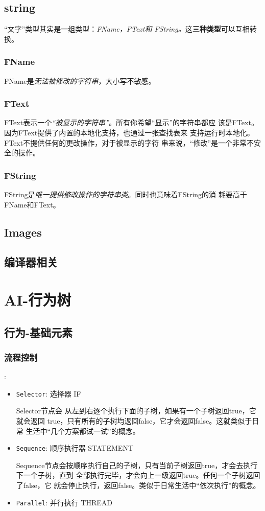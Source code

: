 \documentclass[UTF8,a4paper,12pt]{ctexbook}
\begin{document}
	\section{string}
		“文字”类型其实是一组类型：\textit{FName，FText和 FString。}这\textbf{三种类型}可以互相转换。
		
		\subsection{FName}
			FName是\textit{无法被修改的字符串}，大小写不敏感。
			
		\subsection{FText}
			FText表示一个\textit{“被显示的字符串”}。所有你希望“显示”的字符串都应 该是FText。因为FText提供了内置的本地化支持，也通过一张查找表来 支持运行时本地化。FText不提供任何的更改操作，对于被显示的字符 串来说，“修改”是一个非常不安全的操作。
			
		\subsection{FString}
			FString是\textit{唯一提供修改操作的字符串类}。同时也意味着FString的消 耗要高于FName和FText。
		
	\section{Images}
	
	
	\section{编译器相关}
	

\chapter{AI-行为树}
	\section{行为-基础元素}
	
		\subsection{流程控制}:
			\begin{itemize}
				\item \verb|Selector|: 选择器 IF
				
					Selector节点会 从左到右逐个执行下面的子树，如果有一个子树返回true，它就会返回 true，只有所有的子树均返回false，它才会返回false。这就类似于日常 生活中“几个方案都试一试”的概念。
				\item \verb|Sequence|: 顺序执行器 STATEMENT
				
					Sequence节点会按顺序执行自己的子树，只有当前子树返回true，才会去执行下一个子树，直到 全部执行完毕，才会向上一级返回true。任何一个子树返回了false，它 就会停止执行，返回false。类似于日常生活中“依次执行”的概念。
				\item \verb|Parallel|: 并行执行 THREAD
			\end{itemize}
		
\end{document}
